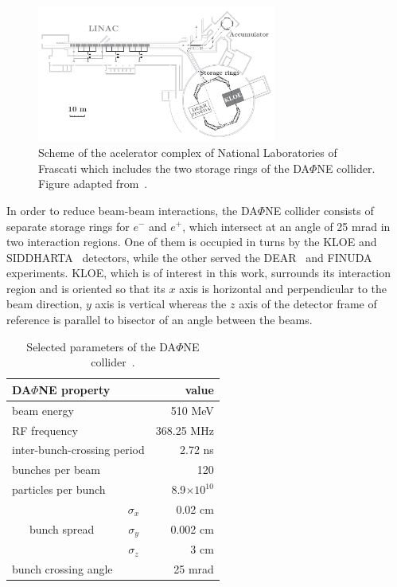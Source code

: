 \begin{figure}[h!]
  \centering
  \includegraphics[width=0.7\textwidth]{Chapter3_detectors/img/dafne}
  \caption{Scheme of the acelerator complex of National Laboratories of Frascati which includes the two storage rings of the DA$\Phi$NE collider. Figure adapted from~\cite{kloe_results}.\label{fig:dafne}}
\end{figure}

In order to reduce beam-beam interactions, the DA$\Phi$NE collider consists of separate storage rings for $e^-$ and $e^+$, which intersect at an angle of 25 mrad in two interaction regions. One of them is occupied in turns by the KLOE and SIDDHARTA~\cite{CurceanuPetrascu:2007zz} detectors, while the other served the DEAR~\cite{Lucherini:2003fk} and FINUDA~\cite{Agnello:2007rk} experiments. KLOE, which is of interest in this work, surrounds its interaction region and is oriented so that its $x$ axis is horizontal and perpendicular to the beam direction, $y$ axis is vertical whereas the $z$ axis of the detector frame of reference is parallel to bisector of an angle between the beams.

\begin{table}[h!]
  \centering
  \caption{Selected parameters of the DA$\Phi$NE collider~\cite{Vignola:1996mt}.\label{tab:dafne}}
  \begin{tabular}{cc r}
    \toprule
    \multicolumn{2}{l}{DA$\Phi$NE property} & value \\
    \midrule
    \multicolumn{2}{l}{beam energy} & 510 MeV \\
    \multicolumn{2}{l}{RF frequency} & 368.25 MHz \\
    \multicolumn{2}{l}{inter-bunch-crossing period} & 2.72 ns \\
    \multicolumn{2}{l}{bunches per beam} & 120 \\
    \multicolumn{2}{l}{particles per bunch} & 8.9$\times 10^{10}$ \\
    \multirow{3}{*}{bunch spread}           & $\sigma_x$ & 0.02 cm \\ 
    \multirow{3}{*}{} & $\sigma_y$ & 0.002 cm \\ 
    \multirow{3}{*}{}           & $\sigma_z$ & 3 cm \\
    \multicolumn{2}{l}{bunch crossing angle} & 25 mrad \\
    \bottomrule
  \end{tabular}
\end{table}

